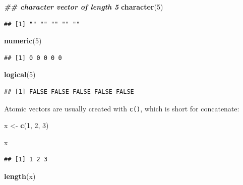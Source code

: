 \documentclass[
]{book}
\newenvironment{Shaded}{\begin{snugshade}}{\end{snugshade}}
\newcommand{\DecValTok}[1]{\textcolor[rgb]{0.00,0.00,0.81}{#1}}
\newcommand{\DocumentationTok}[1]{\textcolor[rgb]{0.56,0.35,0.01}{\textbf{\textit{#1}}}}
\newcommand{\FunctionTok}[1]{\textcolor[rgb]{0.13,0.29,0.53}{\textbf{#1}}}
\newcommand{\NormalTok}[1]{#1}
\newcommand{\OtherTok}[1]{\textcolor[rgb]{0.56,0.35,0.01}{#1}}
\begin{document}
\begin{Shaded}
\begin{Highlighting}[]
\DocumentationTok{\#\# character vector of length 5}
\FunctionTok{character}\NormalTok{(}\DecValTok{5}\NormalTok{)}
\end{Highlighting}
\end{Shaded}

\begin{verbatim}
## [1] "" "" "" "" ""
\end{verbatim}

\begin{Shaded}
\begin{Highlighting}[]
\FunctionTok{numeric}\NormalTok{(}\DecValTok{5}\NormalTok{)}
\end{Highlighting}
\end{Shaded}

\begin{verbatim}
## [1] 0 0 0 0 0
\end{verbatim}

\begin{Shaded}
\begin{Highlighting}[]
\FunctionTok{logical}\NormalTok{(}\DecValTok{5}\NormalTok{)}
\end{Highlighting}
\end{Shaded}

\begin{verbatim}
## [1] FALSE FALSE FALSE FALSE FALSE
\end{verbatim}

Atomic vectors are usually created with \texttt{c()}, which is short for concatenate:

\begin{Shaded}
\begin{Highlighting}[]
\NormalTok{x }\OtherTok{\textless{}{-}} \FunctionTok{c}\NormalTok{(}\DecValTok{1}\NormalTok{, }\DecValTok{2}\NormalTok{, }\DecValTok{3}\NormalTok{)}

\NormalTok{x}
\end{Highlighting}
\end{Shaded}

\begin{verbatim}
## [1] 1 2 3
\end{verbatim}

\begin{Shaded}
\begin{Highlighting}[]
\FunctionTok{length}\NormalTok{(x)}
\end{Highlighting}
\end{Shaded}
\end{document}
